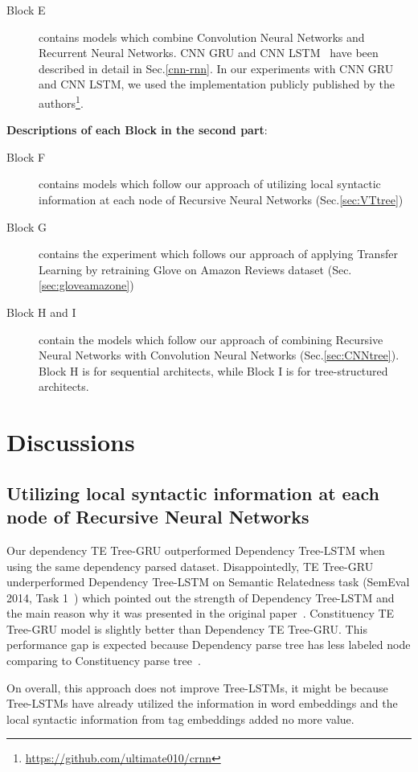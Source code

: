 \begin{description}
\item[Block E] contains models which combine Convolution Neural Networks and Recurrent Neural Networks.
CNN GRU and CNN LSTM~\cite{cnn-rnn} have been described in detail in Sec.\ref{cnn-rnn}.
In our experiments with CNN GRU and CNN LSTM, we used the implementation publicly published by the authors\footnote{\url{https://github.com/ultimate010/crnn}}.
\end{description}

\textbf{Descriptions of each Block in the second part}:
\begin{description}
\item[Block F] contains models which follow our approach of utilizing local syntactic information at each node of Recursive Neural Networks (Sec.\ref{sec:VTtree})
\item[Block G] contains the experiment which follows our approach of applying Transfer Learning by retraining Glove on Amazon Reviews dataset (Sec.\ref{sec:gloveamazone})
\item[Block H and I] contain the models which follow our approach of combining Recursive Neural Networks with Convolution Neural Networks (Sec.\ref{sec:CNNtree}).
Block H is for sequential architects, while Block I is for tree-structured architects.
\end{description}
\section{Discussions}
\subsection{Utilizing local syntactic information at each node of Recursive Neural Networks}
Our dependency TE Tree-GRU outperformed Dependency Tree-LSTM when using the same dependency parsed dataset.
Disappointedly, TE Tree-GRU underperformed Dependency Tree-LSTM on Semantic Relatedness task (SemEval 2014, Task 1~\cite{SemeEvalTask1}) which pointed out the strength of Dependency Tree-LSTM and the main reason why it was presented in the original paper~\cite{treeLSTM}.
Constituency TE Tree-GRU model is slightly better than Dependency TE Tree-GRU.
This performance gap is expected because Dependency parse tree has less labeled node comparing to Constituency parse tree~\cite{treeLSTM}.

\label{unproved:tag-useless}
On overall, this approach does not improve Tree-LSTMs, it might be because Tree-LSTMs have already utilized the information in word embeddings and the local syntactic information from tag embeddings added no more value.


